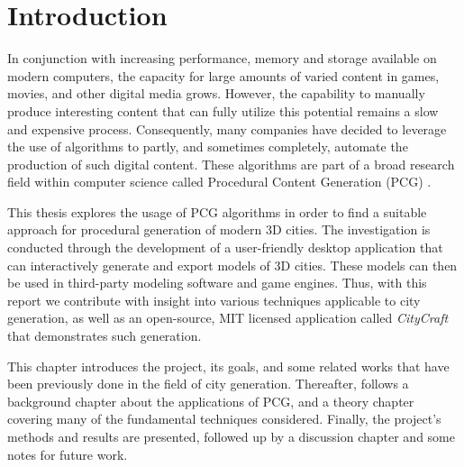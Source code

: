 \chapter{Introduction}


In conjunction with increasing performance, memory and storage available on modern computers, the capacity for large amounts of varied content in games, movies, and other digital media grows.
However, the capability to manually produce interesting content that can fully utilize this potential remains a slow and expensive process.
Consequently, many companies have decided to leverage the use of algorithms to partly, and sometimes completely, automate the production of such digital content.
These algorithms are part of a broad research field within computer science called Procedural Content Generation (PCG) \cite{pcg_in_games}.

This thesis explores the usage of PCG algorithms in order to find a suitable approach for procedural generation of modern 3D cities.
The investigation is conducted through the development of a user-friendly desktop application that can interactively generate and export models of 3D cities.
These models can then be used in third-party modeling software and game engines.
Thus, with this report we contribute with insight into various techniques applicable to city generation, as well as an open-source, MIT licensed application called \textit{CityCraft} that demonstrates such generation.

This chapter introduces the project, its goals, and some related works that have been previously done in the field of city generation.
Thereafter, follows a background chapter about the applications of PCG, and a theory chapter covering many of the fundamental techniques considered.
Finally, the project's methods and results are presented, followed up by a discussion chapter and some notes for future work.

\newpage




